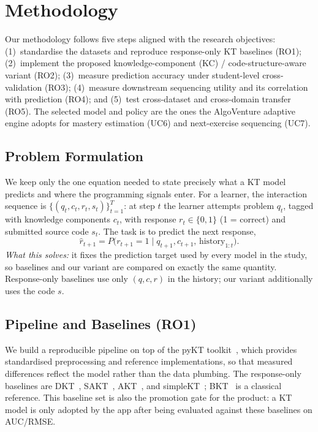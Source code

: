 \section{Methodology}
\label{sec:methodology}

Our methodology follows five steps aligned with the research objectives:
(1)~standardise the datasets and reproduce response-only KT baselines
(RO1); (2)~implement the proposed knowledge-component (KC) /
code-structure-aware variant (RO2); (3)~measure prediction accuracy under
student-level cross-validation (RO3); (4)~measure downstream sequencing
utility and its correlation with prediction (RO4); and (5)~test
cross-dataset and cross-domain transfer (RO5). The selected model and
policy are the ones the AlgoVenture adaptive engine adopts for mastery
estimation (UC6) and next-exercise sequencing (UC7).

\subsection{Problem Formulation}
\label{sec:formulation}
We keep only the one equation needed to state precisely what a KT model
predicts and where the programming signals enter. For a learner, the
interaction sequence is $\{(q_t, c_t, r_t, s_t)\}_{t=1}^{T}$: at step $t$
the learner attempts problem $q_t$, tagged with knowledge components
$c_t$, with response $r_t \in \{0,1\}$ (1 = correct) and submitted source
code $s_t$. The task is to predict the next response,
\begin{equation}
\hat{r}_{t+1} = P\big(r_{t+1}=1 \mid q_{t+1}, c_{t+1},\,
                       \text{history}_{1:t}\big).
\label{eq:kt-task}
\end{equation}
\emph{What this solves:} it fixes the prediction target used by every
model in the study, so baselines and our variant are compared on exactly
the same quantity. Response-only baselines use only $(q,c,r)$ in the
history; our variant additionally uses the code $s$.

\subsection{Pipeline and Baselines (RO1)}
\label{sec:pipeline}
We build a reproducible pipeline on top of the pyKT
toolkit~\cite{liu2022pykt}, which provides standardised preprocessing and
reference implementations, so that measured differences reflect the model
rather than the data plumbing. The response-only baselines are
DKT~\cite{piech2015dkt}, SAKT~\cite{pandey2019sakt},
AKT~\cite{ghosh2020akt}, and simpleKT~\cite{liu2023simplekt};
BKT~\cite{corbett1994bkt} is a classical reference. This baseline set is
also the promotion gate for the product: a KT model is only adopted by
the app after being evaluated against these baselines on AUC/RMSE.


